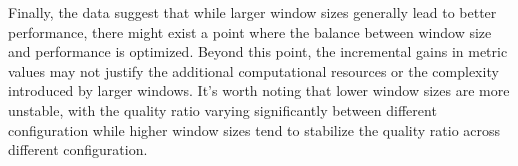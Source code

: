 




Finally, the data suggest that while larger window sizes generally lead to better performance, there might exist a point where the balance between window size and performance is optimized. Beyond this point, the incremental gains in metric values may not justify the additional computational resources or the complexity introduced by larger windows.
It's worth noting that lower window sizes are more unstable, with the quality ratio varying significantly between different configuration while higher window sizes tend to stabilize the quality ratio across different configuration.

